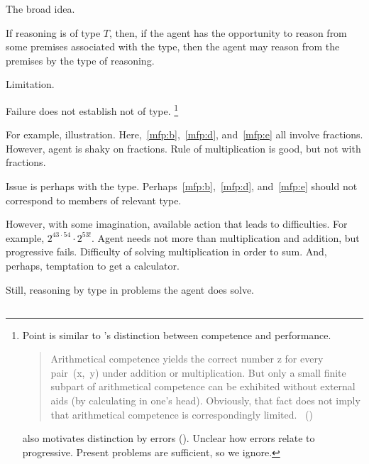 \begin{note}
  The broad idea.

  If reasoning is of type \(T\), then, if the agent has the opportunity to reason from some premises associated with the type, then the agent may reason from the premises by the type of reasoning.
\end{note}

\begin{note}
  Limitation.

  Failure does not establish not of type.%
  \footnote{
    Point is similar to \citeauthor{Chomsky:2015aa}'s distinction between competence and performance.

    \begin{quote}
    Arithmetical competence yields the correct number z for every pair~(x,~y) under addition or multiplication.
    But only a small finite subpart of arithmetical competence can be exhibited without external aids (by calculating in one's head).
    Obviously, that fact does not imply that arithmetical competence is correspondingly limited.%
    \mbox{ }\hfill\mbox{(\citeyear[xii]{Chomsky:2015aa})}
  \end{quote}

    \citeauthor{Chomsky:2015aa} also motivates distinction by errors (\citeyear[2]{Chomsky:2015aa}).
    Unclear how errors relate to progressive.
    Present problems are sufficient, so we ignore.
  }

  For example, illustration.
  Here,~\ref{mfp:b},~\ref{mfp:d}, and~\ref{mfp:e} all involve fractions.
  However, agent is shaky on fractions.
  Rule of multiplication is good, but not with fractions.

  Issue is perhaps with the type.
  Perhaps~\ref{mfp:b},~\ref{mfp:d}, and~\ref{mfp:e} should not correspond to members of relevant type.

  However, with some imagination, available action that leads to difficulties.
  For example, \(2^{43 \cdot 54} \cdot 2^{53!}\).
  Agent needs not more than multiplication and addition, but progressive fails.
  Difficulty of solving multiplication in order to sum.
  And, perhaps, temptation to get a calculator.

  Still, reasoning by type in problems the agent does solve.
\end{note}

\subsection{}
\label{sec:rotoc}

